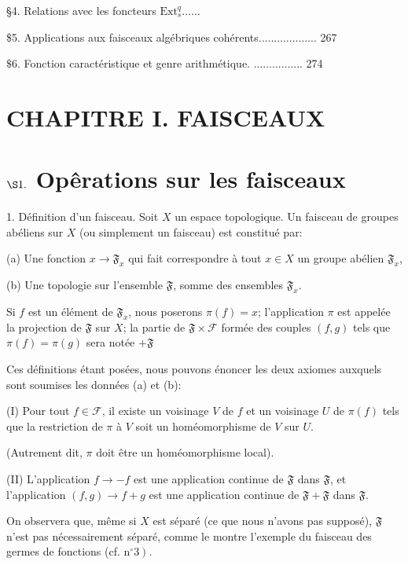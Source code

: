 §4. Relations avec les foncteurs $\mathrm{Ext}_{s}^{q} \ldots \ldots$

\$5. Applications aux faisceaux algébriques cohérents................... 267

$\$ 6$. Fonction caractéristique et genre arithmétique. ................ 274

\section{CHAPITRE I. FAISCEAUX}

\section{$\S 1 .$ Opêrations sur les faisceaux}

1. Définition d'un faisceau. Soit $X$ un espace topologique. Un faisceau de groupes abéliens sur $X$ (ou simplement un faisceau) est constitué par:

(a) Une fonction $x \rightarrow \mathfrak{F}_{x}$ qui fait correspondre à tout $x \in X$ un groupe abélien $\mathfrak{F}_{x}$,

(b) Une topologie sur l'ensemble $\mathfrak{F}$, somme des ensembles $\mathfrak{F}_{x}$.

Si $f$ est un élément de $\mathfrak{F}_{x}$, nous poserons $\pi(f)=x$; l'application $\pi$ est appelée la projection de $\mathfrak{F}$ sur $X$; la partie de $\mathfrak{F} \times \mathcal{F}$ formée des couples $(f, g)$ tels que $\pi(f)=\pi(g)$ sera notée $\mathscr{+} \mathfrak{F}$

Ces définitions étant posées, nous pouvons énoncer les deux axiomes auxquels sont soumises les données (a) et (b):

(I) Pour tout $f \in \mathcal{F}$, il existe un voisinage $V$ de $f$ et un voisinage $U$ de $\pi(f)$ tels que la restriction de $\pi$ à $V$ soit un homéomorphisme de $V$ sur $U$.

(Autrement dit, $\pi$ doit être un homéomorphisme local).

(II) L'application $f \rightarrow-f$ est une application continue de $\mathfrak{F}$ dans $\mathfrak{F}$, et l'application $(f, g) \rightarrow f+g$ est une application continue de $\mathfrak{F}+\mathfrak{F}$ dans $\mathfrak{F} .$

On observera que, même si $X$ est séparé (ce que nous n'avons pas supposé), $\mathfrak{F}$ n'est pas nécessairement séparé, comme le montre l'exemple du faisceau des germes de fonctions (cf. $\left.\mathrm{n}^{\circ} 3\right)$.

